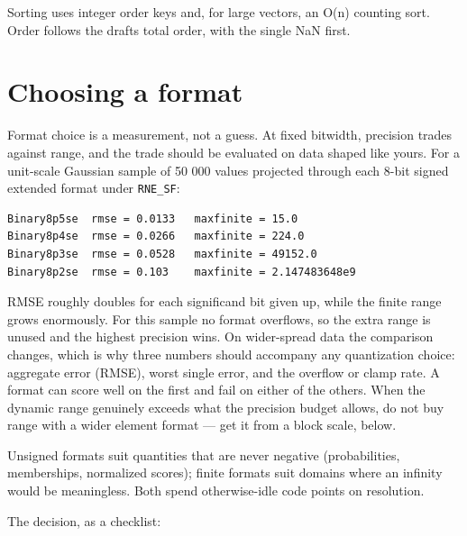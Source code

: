 Sorting uses integer order keys and, for large vectors, an O(n) counting sort. Order follows the draft{\textquotesingle}s total order, with the single NaN first.



\section{Choosing a format}



\label{10423729552281943573}{}


Format choice is a measurement, not a guess. At fixed bitwidth, precision trades against range, and the trade should be evaluated on data shaped like yours. For a unit-scale Gaussian sample of 50 000 values projected through each 8-bit signed extended format under \texttt{RNE\_SF}:




\begin{verbatim}
Binary8p5se  rmse = 0.0133   maxfinite = 15.0
Binary8p4se  rmse = 0.0266   maxfinite = 224.0
Binary8p3se  rmse = 0.0528   maxfinite = 49152.0
Binary8p2se  rmse = 0.103    maxfinite = 2.147483648e9
\end{verbatim}



RMSE roughly doubles for each significand bit given up, while the finite range grows enormously. For this sample no format overflows, so the extra range is unused and the highest precision wins. On wider-spread data the comparison changes, which is why three numbers should accompany any quantization choice: aggregate error (RMSE), worst single error, and the overflow or clamp rate. A format can score well on the first and fail on either of the others. When the dynamic range genuinely exceeds what the precision budget allows, do not buy range with a wider element format — get it from a block scale, below.



Unsigned formats suit quantities that are never negative (probabilities, memberships, normalized scores); finite formats suit domains where an infinity would be meaningless. Both spend otherwise-idle code points on resolution.



The decision, as a checklist:



